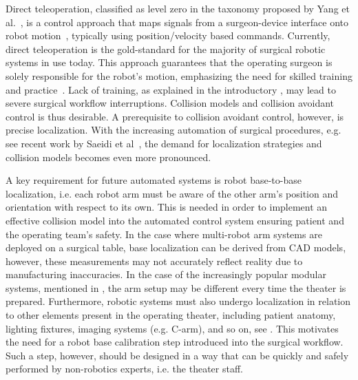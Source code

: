 Direct teleoperation, classified as level zero in the taxonomy proposed by Yang et al.~\cite{Yang2017}, is a control approach that maps signals from a surgeon-device interface onto robot motion~\cite{Niemeyer2008}, typically using position/velocity based commands.
Currently, direct teleoperation is the gold-standard for the majority of surgical robotic systems in use today. This approach guarantees that the operating surgeon is solely responsible for the robot's motion, emphasizing the need for skilled training and practice~\cite{Liu15}. Lack of training, as explained in the introductory , may lead to severe surgical workflow interruptions. Collision models and collision avoidant control is thus desirable. A prerequisite to collision avoidant control, however, is precise localization. With the increasing automation of surgical procedures, e.g. see recent work by Saeidi et al~\cite{Saeidi2022}, the demand for localization strategies and collision models becomes even more pronounced.


A key requirement for future automated systems is robot base-to-base localization, i.e. each robot arm must be aware of the other arm's position and orientation with respect to its own. This is needed in order to implement an effective collision model into the automated control system ensuring patient and the operating team's safety. In the case where multi-robot arm systems are deployed on a surgical table, base localization can be derived from CAD models, however, these measurements may not accurately reflect reality due to manufacturing inaccuracies. In the case of the increasingly popular modular systems, mentioned in , the arm setup may be different every time the theater is prepared. Furthermore, robotic systems must also undergo localization in relation to other elements present in the operating theater, including patient anatomy, lighting fixtures, imaging systems (e.g. C-arm), and so on, see . This motivates the need for a robot base calibration step introduced into the surgical workflow. Such a step, however, should be designed in a way that can be quickly and safely performed by non-robotics experts, i.e. the theater staff.



